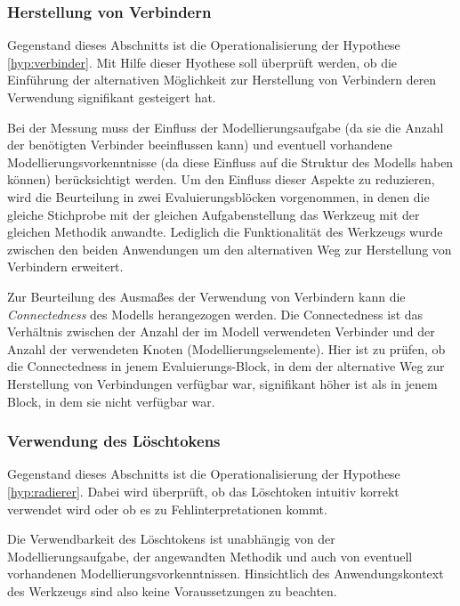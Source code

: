 \subsubsection{Herstellung von Verbindern} %
\label{ssub:herstellung_von_verbindern}

Gegenstand dieses Abschnitts ist die Operationalisierung der Hypothese \ref{hyp:verbinder}. Mit Hilfe dieser Hyothese soll überprüft werden, ob die Einführung der alternativen Möglichkeit zur Herstellung von Verbindern deren Verwendung signifikant gesteigert hat.

Bei der Messung muss der Einfluss der Modellierungsaufgabe (da sie die Anzahl der benötigten Verbinder beeinflussen kann) und eventuell vorhandene Modellierungsvorkenntnisse (da diese Einfluss auf die Struktur des Modells haben können) berücksichtigt werden. Um den Einfluss dieser Aspekte zu reduzieren, wird die Beurteilung in zwei Evaluierungsblöcken vorgenommen, in denen die gleiche Stichprobe mit der gleichen Aufgabenstellung das Werkzeug mit der gleichen Methodik anwandte. Lediglich die Funktionalität des Werkzeugs wurde zwischen den beiden Anwendungen um den alternativen Weg zur Herstellung von Verbindern erweitert.  

Zur Beurteilung des Ausmaßes der Verwendung von Verbindern kann die \emph{Connectedness} des Modells herangezogen werden. Die Connectedness ist das Verhältnis zwischen der Anzahl der im Modell verwendeten Verbinder und der Anzahl der verwendeten Knoten (Modellierungselemente). Hier ist zu prüfen, ob die Connectedness in jenem Evaluierungs-Block, in dem der alternative Weg zur Herstellung von Verbindungen verfügbar war, signifikant höher ist als in jenem Block, in dem sie nicht verfügbar war.


\subsubsection{Verwendung des Löschtokens} %
\label{ssub:löschtoken}

Gegenstand dieses Abschnitts ist die Operationalisierung der Hypothese \ref{hyp:radierer}. Dabei wird überprüft, ob das Löschtoken intuitiv korrekt verwendet wird oder ob es zu Fehlinterpretationen kommt.

Die Verwendbarkeit des Löschtokens ist unabhängig von der Modellierungsaufgabe, der angewandten Methodik und auch von eventuell vorhandenen Modellierungsvorkenntnissen. Hinsichtlich des Anwendungskontext des Werkzeugs sind also keine Voraussetzungen zu beachten.

